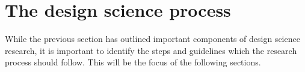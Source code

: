 
\section{The design science process} \label{sec:DesignScienceProcess}
While the previous section has outlined important components of design science research, it is important to identify the steps and guidelines which the research process should follow. This will be the focus of the following sections.

